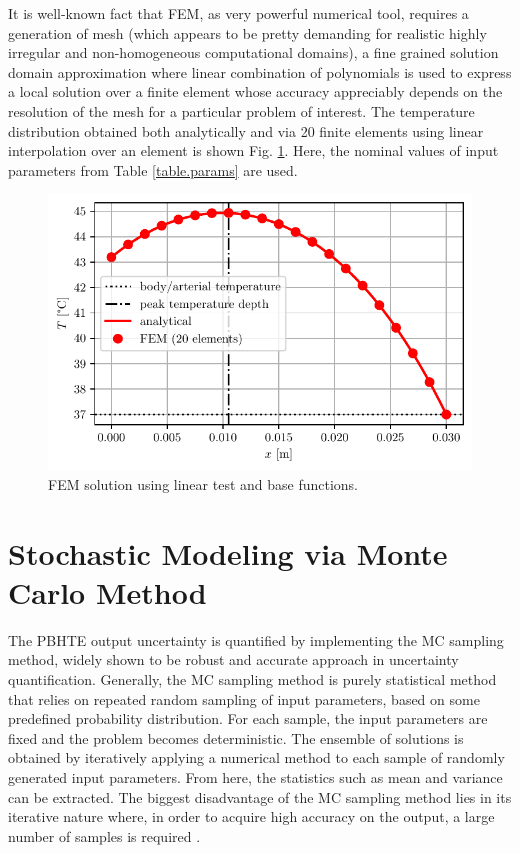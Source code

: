 \documentclass[conference]{IEEEtran}
\begin{document}
It is well-known fact that FEM, as very powerful numerical tool, requires a generation of mesh (which appears to be pretty demanding for realistic highly irregular and non-homogeneous computational domains), a fine grained solution domain approximation where linear combination of polynomials is used to express a local solution over a finite element whose accuracy appreciably depends on the resolution of the mesh for a particular problem of interest.
The temperature distribution obtained both analytically and via 20 finite elements using linear interpolation over an element is shown Fig. \ref{fig.fem}. Here, the nominal values of input parameters from Table \ref{table.params} are used.
\begin{figure}[]
\centering
 \includegraphics[width=\linewidth]{figs/FEM-20felems.pdf}
\caption{FEM solution using linear test and base functions.}
\label{fig.fem}
\end{figure}

\section{Stochastic Modeling via Monte Carlo Method}
\label{sec.stochastic-modeling}
The PBHTE output uncertainty is quantified by implementing the MC sampling method, widely shown to be robust and accurate approach in uncertainty quantification.
Generally, the MC sampling method is purely statistical method that relies on repeated random sampling of input parameters, based on some predefined probability distribution. 
For each sample, the input parameters are fixed and the problem becomes deterministic. The ensemble of solutions is obtained by iteratively applying a numerical method to each sample of randomly generated input parameters. From here, the statistics such as mean and variance can be extracted.
The biggest disadvantage of the MC sampling method lies in its iterative nature where, in order to acquire high accuracy on the output, a large number of samples is required \cite{xiu_stochasticism_2009}.
\end{document}

